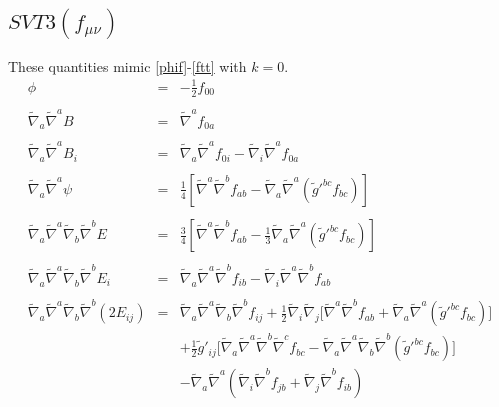 \documentclass[10pt,letterpaper]{article}
\numberwithin{equation}{section}
\begin{document}
\subsection{$SVT3(f_{\mu\nu})$}
These quantities mimic \eqref{phif}-\eqref{ftt} with $k=0$.
\begin{eqnarray}
\phi &=& -\tfrac{1}{2} f_{00}
\label{phifp}
\\ \nonumber\\
\tilde\nabla_a\tilde\nabla^a B &=& \tilde\nabla^a f_{0a}
\\ \nonumber\\
\tilde\nabla_a\tilde\nabla^a B_i &=& \tilde\nabla_a\tilde\nabla^a f_{0i} -\tilde\nabla_i \tilde\nabla^a f_{0a}
\\ \nonumber\\
\tilde\nabla_a\tilde\nabla^a\psi &=& \frac{1}{4}\left[\tilde\nabla^a\tilde\nabla^b f_{ab}-\tilde\nabla_a\tilde\nabla^a (\tilde g'^{bc}f_{bc})\right]
\\ \nonumber\\
\tilde\nabla_a\tilde\nabla^a\tilde\nabla_b\tilde\nabla^b E &=& \frac{3}{4}\left[ \tilde\nabla^a\tilde\nabla^b f_{ab} -\frac{1}{3}\tilde\nabla_a\tilde\nabla^a (\tilde g'^{bc}f_{bc})\right]
\\ \nonumber\\
\tilde\nabla_a\tilde\nabla^a \tilde\nabla_b\tilde\nabla^b E_i &=&
\tilde\nabla_a\tilde\nabla^a \tilde\nabla^b f_{ib} - \tilde\nabla_i \tilde\nabla^a\tilde\nabla^b f_{ab}
\label{Ep}
\\ \nonumber\\
\tilde\nabla_a\tilde\nabla^a\tilde\nabla_b\tilde\nabla^b (2E_{ij})
&=& 
\tilde\nabla_a\tilde\nabla^a\tilde\nabla_b\tilde\nabla^bf_{ij}
+ \tfrac12 \tilde\nabla_i\tilde\nabla_j\big[ \tilde\nabla^a\tilde\nabla^b f_{ab} + \tilde\nabla_a\tilde\nabla^a (\tilde g'^{bc}f_{bc})\big]
\nonumber\\
&&
+\tfrac12 \tilde g'_{ij} \big[ \tilde\nabla_a\tilde\nabla^a\tilde\nabla^b\tilde\nabla^c f_{bc}-\tilde\nabla_a\tilde\nabla^a\tilde\nabla_b\tilde\nabla^b(\tilde g'^{bc}f_{bc})\big]
\nonumber\\
&&
-\tilde\nabla_a\tilde\nabla^a (\tilde\nabla_i\tilde\nabla^b f_{jb} + \tilde\nabla_j \tilde\nabla^b f_{ib})
\label{fttp}
\end{eqnarray}

\end{document}

